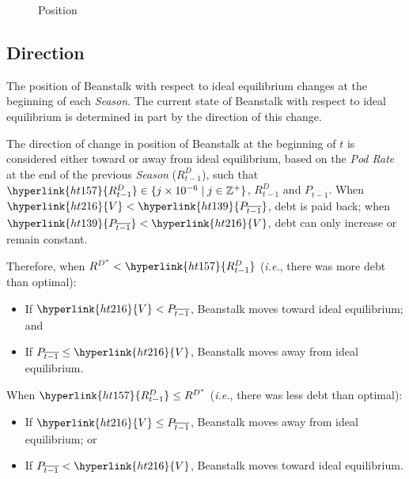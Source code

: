 \documentclass[tikz]{article}
\newcommand{\term}[1]{\textsl{#1}}
\begin{document}
\begin{figure}[h!]
    \centering
    
    \vspace*{-7mm}
    \caption{Position}
    \label{Fig 5}
\end{figure} 

\subsection{Direction}
The position of Beanstalk with respect to ideal equilibrium changes at the beginning of each \term{Season}. The current state of Beanstalk with respect to ideal equilibrium is determined in part by the direction of this change. 

The direction of change in position of Beanstalk at the beginning of \hyperlink{ht204}{$t$} is considered either toward or away from ideal equilibrium, based on the \term{Pod Rate} at the end of the previous \term{Season} (\hyperlink{ht157}{$R^D_{t-1}$}), such that $\hyperlink{ht157}{R^D_{t-1}} \in \{j \times 10^{-6} \mid j \in \mathbb{Z}^{+} \}$, \hyperlink{ht157}{$R^D_{t-1}$} and \hyperlink{ht139}{$P_{\overline{t-1}}$}. When $\hyperlink{ht216}{V} < \hyperlink{ht139}{P_{\overline{t-1}}}$, debt is paid back; when $\hyperlink{ht139}{P_{\overline{t-1}}} < \hyperlink{ht216}{V}$, debt can only increase or remain constant.

\newpage

Therefore, when $R^{D^*} < \hyperlink{ht157}{R^D_{t-1}}$ (\term{i.e.}, there was more debt than optimal):
\begin{itemize}[topsep=0pt, itemsep=1pt]
    \item If $\hyperlink{ht216}{V} < P_{\overline{t-1}}$, Beanstalk moves toward ideal equilibrium; and
    \item If $P_{\overline{t-1}} \leq \hyperlink{ht216}{V}$, Beanstalk moves away from ideal equilibrium.
\end{itemize}
When $\hyperlink{ht157}{R^D_{t-1}} \leq R^{D^*}$ (\term{i.e.}, there was less debt than optimal):
\begin{itemize}[topsep=0pt, itemsep=1pt]
    \item If $\hyperlink{ht216}{V} \leq P_{\overline{t-1}}$, Beanstalk moves away from ideal equilibrium; or 
    \item If $P_{\overline{t-1}} < \hyperlink{ht216}{V}$, Beanstalk moves toward ideal equilibrium.
\end{itemize}
\end{document}
